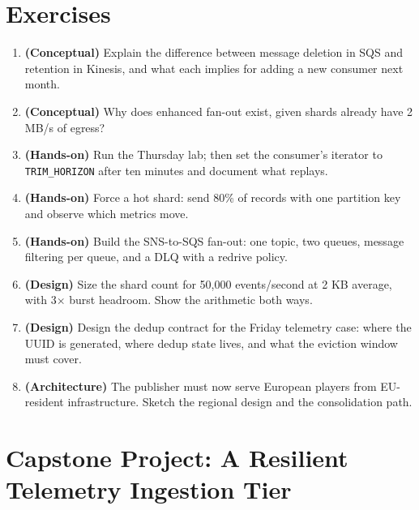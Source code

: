 \section{Exercises}
\begin{enumerate}
    \item \textbf{(Conceptual)} Explain the difference between message deletion in SQS and retention in Kinesis, and what each implies for adding a new consumer next month.
    \item \textbf{(Conceptual)} Why does enhanced fan-out exist, given shards already have 2 MB/s of egress?
    \item \textbf{(Hands-on)} Run the Thursday lab; then set the consumer's iterator to \texttt{TRIM\_HORIZON} after ten minutes and document what replays.
    \item \textbf{(Hands-on)} Force a hot shard: send 80\% of records with one partition key and observe which metrics move.
    \item \textbf{(Hands-on)} Build the SNS-to-SQS fan-out: one topic, two queues, message filtering per queue, and a DLQ with a redrive policy.
    \item \textbf{(Design)} Size the shard count for 50{,}000 events/second at 2 KB average, with 3$\times$ burst headroom. Show the arithmetic both ways.
    \item \textbf{(Design)} Design the dedup contract for the Friday telemetry case: where the UUID is generated, where dedup state lives, and what the eviction window must cover.
    \item \textbf{(Architecture)} The publisher must now serve European players from EU-resident infrastructure. Sketch the regional design and the consolidation path.
\end{enumerate}

\section{Capstone Project: A Resilient Telemetry Ingestion Tier}\label{sec:ch13-capstone}

